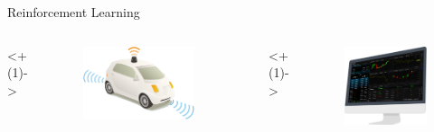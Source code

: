 \begin{frame}{Reinforcement Learning}
\begin{columns}
	\onslide<+(1)->
	\begin{column}{0.4\textwidth}
	\begin{figure}
		\centering
		\includegraphics[width=1\linewidth]{Images/self_driving_car}
	\end{figure}
	\end{column}
	
	\begin{column}{0.02\textwidth}
	\end{column}
	
	\onslide<+(1)->
	\begin{column}{0.2\textwidth}
	\begin{figure}
		\centering
		\includegraphics[width=1\linewidth]{Images/portfolio_investment}
	\end{figure}
	\end{column}
	

\end{columns}
\end{frame}

